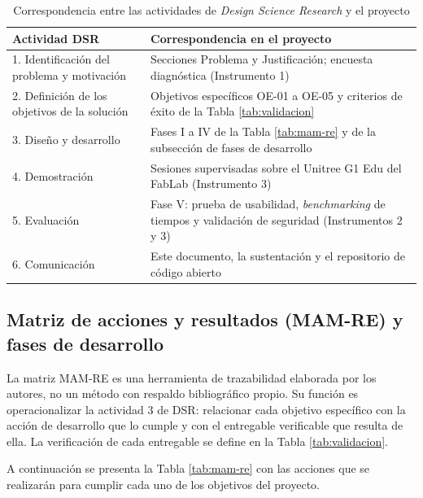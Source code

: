\documentclass[stu,12pt,floatsintext]{apa7}
\begin{document}
\begin{table}[htbp]
\centering
\caption{Correspondencia entre las actividades de \textit{Design Science Research} y el proyecto}
\label{tab:dsr}
\begin{tabular}{|p{5.0cm}|p{9.4cm}|}
\hline
\rowcolor{gray!20}
\textbf{Actividad DSR} & \textbf{Correspondencia en el proyecto} \\
\hline
1. Identificación del problema y motivación & Secciones Problema y Justificación; encuesta diagnóstica (Instrumento 1) \\
\hline
2. Definición de los objetivos de la solución & Objetivos específicos OE-01 a OE-05 y criterios de éxito de la Tabla \ref{tab:validacion} \\
\hline
3. Diseño y desarrollo & Fases I a IV de la Tabla \ref{tab:mam-re} y de la subsección de fases de desarrollo \\
\hline
4. Demostración & Sesiones supervisadas sobre el Unitree G1 Edu del FabLab (Instrumento 3) \\
\hline
5. Evaluación & Fase V: prueba de usabilidad, \textit{benchmarking} de tiempos y validación de seguridad (Instrumentos 2 y 3) \\
\hline
6. Comunicación & Este documento, la sustentación y el repositorio de código abierto \\
\hline
\end{tabular}
\end{table}

\subsection{Matriz de acciones y resultados (MAM-RE) y fases de desarrollo}

La matriz MAM-RE es una herramienta de trazabilidad elaborada por los autores, no un método con respaldo bibliográfico propio. Su función es operacionalizar la actividad 3 de DSR: relacionar cada objetivo específico con la acción de desarrollo que lo cumple y con el entregable verificable que resulta de ella. La verificación de cada entregable se define en la Tabla \ref{tab:validacion}.

A continuación se presenta la Tabla \ref{tab:mam-re} con las acciones que se realizarán para cumplir cada uno de los objetivos del proyecto.
\end{document}
